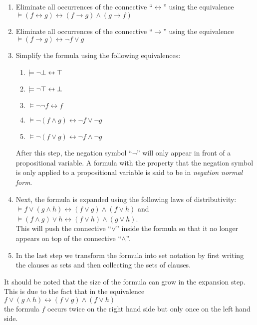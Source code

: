 \begin{enumerate}
\item Eliminate all occurrences of the connective ``$\leftrightarrow$'' using the equivalence \\[0.2cm]
      \hspace*{1.3cm} $\models (f \leftrightarrow g) \leftrightarrow (f \rightarrow g) \wedge (g \rightarrow f)$
\item Eliminate all occurrences of the connective ``$\rightarrow$'' using the equivalence \\[0.2cm]
      \hspace*{1.3cm} $\models (f \rightarrow g) \leftrightarrow \neg f \vee g$
\item Simplify the formula using the following equivalences:
      \begin{enumerate}
      \item $\models \neg \bot \leftrightarrow \top$
      \item $\models \neg \top \leftrightarrow \bot$
      \item $\models \neg \neg f \leftrightarrow f$
      \item $\models \neg (f \wedge g) \leftrightarrow  \neg f \vee   \neg g$ 
      \item $\models \neg (f \vee   g) \leftrightarrow  \neg f \wedge \neg g$ 
      \end{enumerate}
      After this step, the negation symbol ``$\neg$'' will only appear in front of a propositional
      variable.  A formula with the property that the negation symbol is only applied to a
      propositional variable is said to be in \emph{negation normal form}.
\item Next, the formula is expanded using the following laws of distributivity: \\[0.2cm]
      \hspace*{1.3cm} 
      $\models f \vee (g \wedge h) \leftrightarrow (f \vee g) \wedge (f \vee h)$ \quad and \quad
      $\models (f \wedge g) \vee h \leftrightarrow (f \vee h) \wedge (g \vee h)$. 
      \\[0.2cm]
      This will push the connective ``$\vee$'' inside the formula so that it no longer appears on top
      of the connective ``$\wedge$''.
\item In the last step we transform the formula into set notation by first writing the clauses
      as sets and then collecting the sets of clauses.
\end{enumerate}
It should be noted that the size of the formula can  grow in the expansion step.
This is due to the fact that in the equivalence
\\[0.2cm]
\hspace*{1.3cm}
$f \vee (g \wedge h) \leftrightarrow (f \vee g) \wedge (f \vee h)$
\\[0.2cm]
the formula $f$ occurs twice on the right hand side but only once on the left hand side.
 

